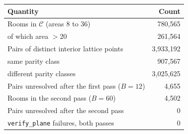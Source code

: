 \documentclass[11pt]{article}
\theoremstyle{definition}
\theoremstyle{remark}
\begin{document}
\begin{center}
\begin{tabular}{lr}
\toprule
Quantity & Count \\
\midrule
Rooms in $\mathcal C$ (areas 8 to 36) & 780{,}565 \\
\quad of which area $>20$ & 261{,}564 \\
Pairs of distinct interior lattice points & 3{,}933{,}192 \\
\quad same parity class & 907{,}567 \\
\quad different parity classes & 3{,}025{,}625 \\
Pairs unresolved after the first pass ($B=12$) & 4{,}655 \\
Rooms in the second pass ($B=60$) & 4{,}502 \\
Pairs unresolved after the second pass & 0 \\
\texttt{verify\_plane} failures, both passes & 0 \\
\bottomrule
\end{tabular}
\end{center}
\end{document}
